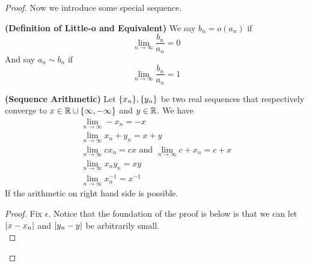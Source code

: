 \documentclass{report}
\begin{document}
\begin{proof}
{\begin{minipage}{39em}
Now we introduce some special sequence. 
\end{minipage}}
\begin{definition}
\label{4.1.5}
\textbf{(Definition of Little-o and Equivalent)} We say $b_n=o(a_n)$ if
\begin{equation}
\lim_{n\to\infty}\frac{b_n}{a_n}=0
\end{equation}
And say $a_n\sim b_n$ if
\begin{equation}
\lim_{n\to\infty} \frac{b_n}{a_n}=1
\end{equation}
\end{definition}
\begin{theorem}
\label{4.1.6}
\textbf{(Sequence Arithmetic)} Let $\{ x_n \},\{ y_n \}$ be two real sequences that respectively converge to $x\in\mathbb{R}\cup \{ \infty,-\infty \}$ and  $y\in\mathbb{R}$. We have
\begin{gather}
\lim_{n\to\infty} -x_n=-x\\
\lim_{n\to\infty} x_n+y_n= x+y\\
\lim_{n\to\infty} cx_n=cx\text{ and }\lim_{n\to\infty}c+x_n=c+x\\
\lim_{n\to\infty} x_ny_n=xy\\
\lim_{n\to\infty} x_n^{-1}=x^{-1}
\end{gather}
If the arithmetic on right hand side is possible. 
\end{theorem}
\begin{proof}
Fix $\epsilon $. Notice that the foundation of the proof is below is that we can let $|x-x_n|$ and $|y_n-y|$ be arbitrarily small.\\


\end{proof}
\end{proof}
\end{document}
